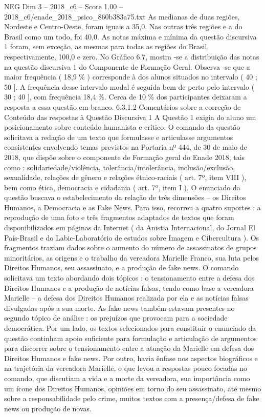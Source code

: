 \begin{textsample}{NEG Dim 3 – 2018\_c6 – Score 1.00 – 2018\_c6/enade\_2018\_psico\_860b383a75.txt}
As medianas de duas regiões, Nordeste e Centro-Oeste, foram iguais a 35,0.
Nas outras três regiões e a do Brasil como um todo, foi 40,0.
As notas máxima e mínima da questão discursiva 1 foram, sem exceção, as mesmas para todas as regiões do Brasil, respectivamente, 100,0 e zero.
No Gráfico 6.7, mostra -se a distribuição das notas na questão discursiva 1 do Componente de Formação Geral.
Observa -se que a maior frequência ( 18,9 \% ) corresponde à dos alunos situados no intervalo ( 40 ; 50 ].
A frequência desse intervalo modal é seguida bem de perto pelo intervalo ( 30 ; 40 ], com frequência 18,4 \%.
Cerca de 10 \% dos participantes deixaram a resposta a essa questão em branco. 6.3.1.2 Comentários sobre a correção de Conteúdo das respostas à Questão Discursiva 1 A Questão 1 exigia do aluno um posicionamento sobre conteúdo humanista e crítico.
O comando da questão solicitava a redação de um texto que formulasse e articulasse argumentos consistentes envolvendo temas previstos na Portaria nº 444, de 30 de maio de 2018, que dispõe sobre o componente de Formação geral do Enade 2018, tais como : solidariedade/violência, tolerância/intolerância, inclusão/exclusão, sexualidade, relações de gênero e relações étnico-raciais ( art. 7º, item VIII ), bem como ética, democracia e cidadania ( art. 7º, item I ).
O enunciado da questão buscava o estabelecimento da relação de três dimensões – os Direitos Humanos, a Democracia e as Fake News.
Para isso, recorreu a quatro suportes : a reprodução de uma foto e três fragmentos adaptados de textos que foram disponibilizados em páginas da Internet ( da Anistia Internacional, do Jornal El País-Brasil e do Labic-Laboratório de estudos sobre Imagem e Cibercultura ).
Os fragmentos traziam dados sobre o aumento do número de assassinatos de grupos minoritários, as origens e o trabalho da vereadora Marielle Franco, sua luta pelos Direitos Humanos, seu assassinato, e a produção de fake news.
O comando solicitava um texto abordando dois tópicos : o tensionamento entre a defesa dos Direitos Humanos e a produção de notícias falsas, tendo como base a vereadora Marielle – a defesa dos Direitos Humanos realizada por ela e as notícias falsas divulgadas após a sua morte.
As fake news também estavam presentes no segundo tópico de análise : os prejuízos que provocam para a sociedade democrática.
Por um lado, os textos selecionados para constituir o enunciado da questão continham apoio suficiente para formulação e articulação de argumentos para discorrer sobre o tensionamento entre a atuação da Marielle em defesa dos Direitos Humanos e fake news.
Por outro, havia ênfase nos aspectos biográficos e na trajetória da vereadora Marielle, o que levou a respostas pouco focadas no comando, que discutiam a vida e a morte da vereadora, sua importância como um ícone dos Direitos Humanos, opiniões em torno do seu assassinato, até mesmo sobre a responsabilidade pelo crime, muitos textos com a presença/defesa de fake news ou produção de novas.

\end{textsample}
